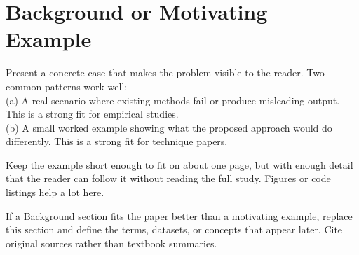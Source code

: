 \section{Background or Motivating Example}
Present a concrete case that makes the problem visible to the reader.
Two common patterns work well:\\
  (a) A real scenario where existing methods fail or produce misleading
      output. This is a strong fit for empirical studies.\\
  (b) A small worked example showing what the proposed approach would do
      differently. This is a strong fit for technique papers.

Keep the example short enough to fit on about one page, but with enough
detail that the reader can follow it without reading the full study.
Figures or code listings help a lot here.

If a Background section fits the paper better than a motivating example,
replace this section and define the terms, datasets, or concepts that
appear later. Cite original sources rather than textbook summaries.

\clearpage